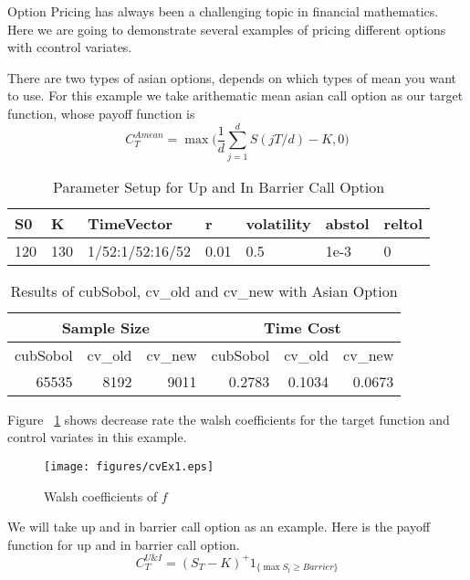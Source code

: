Option Pricing has always been a challenging topic in financial mathematics.
Here we are going to demonstrate several examples of pricing different options with ccontrol variates.


There are two types of asian options, depends on which types of mean you want to use. For this example we take arithematic mean asian call option as our target function, whose payoff function is
\[ C_{T}^{Amean} = \max\Big(\frac{1}{d}\sum_{j=1}^{d}S(jT/d)-K, 0\Big)\]

\begin{table}[h]
    \centering
	\caption{Parameter Setup for Up and In Barrier Call Option}
	\begin{tabular}{lllllll}
		\hline\hline
        S0 & K & TimeVector & r & volatility & abstol & reltol \\[0.5ex]
        \hline
        120  & 130 & 1/52:1/52:16/52 & 0.01 & 0.5 & 1e-3 & 0\\[1ex] 
        \hline
	\end{tabular}
\end{table}

\begin{table}[h]
    \centering
	\caption{Results of cubSobol, cv\_old and cv\_new with Asian Option}
    \begin{tabular}{rrrrrr}  
    \hline\hline
	\multicolumn{3}{c}{Sample Size}
		&\multicolumn{3}{c}{Time Cost} \\
    \hline
	 cubSobol&cv\_old&cv\_new
    &cubSobol&cv\_old&cv\_new\\[0.5ex]
    \hline
		 65535&8192&9011
    &0.2783&0.1034&0.0673\\[1ex]
    \hline
	\end{tabular}
\end{table}

Figure ~\ref{fg:cvEX1} shows decrease rate the walsh coefficients for the target function and control variates in this example.

\begin{figure}[h]
    \centering
    \texttt{[image: figures/cvEx1.eps]}
    \label{fg:cvEX1}
    \caption{Walsh coefficients of $f$}
\end{figure}


We will take up and in barrier call option as an example. Here is the payoff function for up and in barrier call option.
\[ C_{T}^{U\&I} = (S_T-K)^+1_{ \{\max S_t \geq Barrier\}} \]

